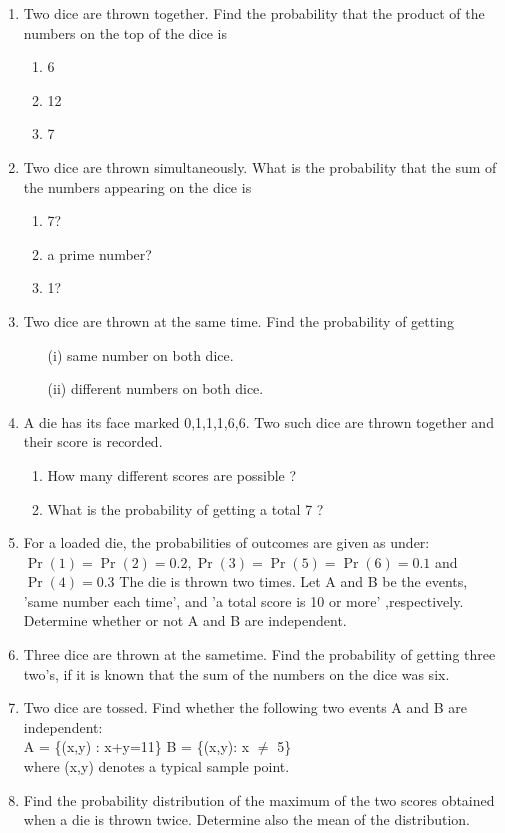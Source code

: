 \begin{enumerate}[label=\thesection.\arabic*,ref=\thesection.\theenumi]
	\item Two dice are thrown together. Find the probability that the product of the numbers
on the top of the dice is
\begin{enumerate}
\item 6
\item 12
\item 7
\end{enumerate}
		\solution
		
  \item Two dice are thrown simultaneously. What is the probability that the sum of the numbers appearing on the dice is 
\begin{enumerate}
\item{7?}
\item{a prime number?}
\item{1?}
\end{enumerate}
\solution

\item Two dice are thrown at the same time. Find the probability of getting
\begin{enumerate}
    \item[(i)] same number on both dice.
    \item[(ii)] different numbers on both dice.
\end{enumerate}

\item A die has its face marked 0,1,1,1,6,6. Two such dice are thrown together and their score is recorded.
\begin{enumerate}
	\item How many different scores are possible ?
	\item What is the probability of getting a total 7 ?  
\end{enumerate}

\item For a loaded die, the probabilities of outcomes are given as under:
$\Pr(1) = \Pr(2) = 0.2, \Pr(3) = \Pr(5) = \Pr(6) = 0.1$ and $\Pr(4) = 0.3$
The die is thrown two times. Let A and B be the events, 'same number each time', and
'a total score is 10 or more' ,respectively. Determine whether or not A and B are independent.

\item Three dice are thrown at the sametime. Find the probability of getting three
two’s, if it is known that the sum of the numbers on the dice was six.

\item Two dice are tossed. Find whether the following two events A and B are independent:\\
A = \{(x,y) : x+y=11\} B = \{(x,y): x $\neq$ 5\}\\
where (x,y) denotes a typical sample point.

\item Find the probability distribution of the maximum of the two scores obtained when a die is thrown twice. Determine also the mean of the distribution.\\

\end{enumerate}
